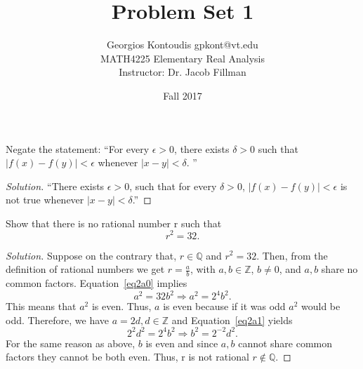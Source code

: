 \documentclass[12pt]{article}
\newenvironment{exercise}[2][Exercise]{\begin{trivlist}
\item[\hskip \labelsep {\bfseries #1}\hskip \labelsep {\bfseries #2.}]}{\end{trivlist}}
\newenvironment{solution}{\begin{proof}[Solution]}{\end{proof}}
\begin{document}
 
 
\title{Problem Set 1}
\author{Georgios Kontoudis \textbullet{} gpkont@vt.edu\\ 
MATH4225 Elementary Real Analysis\\
Instructor: Dr. Jacob Fillman} 
\date{Fall 2017}
 
\maketitle
\begin{exercise}{1} %
Negate the statement: ``For every $\epsilon >0$, there exists $\delta >0$ such that $|f(x)-f(y)|< \epsilon$ whenever $|x-y|< \delta$. ''
\end{exercise}
\begin{solution}
``There exists $\epsilon >0$, such that for every $\delta >0$, $|f(x)-f(y)|< \epsilon$ is not true whenever $|x-y|< \delta$.'' 
\end{solution}

\begin{exercise}{2 (a)} %
Show that there is no rational number r such that 
\begin{equation}\label{eq2a0}
r^2 = 32.
\end{equation}
\end{exercise}
\begin{solution}
Suppose on the contrary that, $r\in \mathbb{Q}$ and $r^2=32$. Then, from the definition of rational numbers we get $r=\frac{a}{b}$, with $a,b \in \mathbb{Z}$, $b\neq0$, and $a,b$ share no common factors. Equation~\ref{eq2a0} implies
\begin{equation}\label{eq2a1}
a^2=32b^2 \Rightarrow a^2 = 2^4 b^2.
\end{equation}
This means that $a^2$ is even. Thus, $a$ is even because if it was odd $a^2$ would be odd. Therefore, we have $a=2d, d\in \mathbb{Z}$ and Equation~\ref{eq2a1} yields
\begin{equation}
2^2d^2=2^4b^2 \Rightarrow b^2=2^{-2}d^2.
\end{equation}
For the same reason as above, $b$ is even and since $a,b$ cannot share common factors they cannot be both even. Thus, r is not rational $r \notin \mathbb{Q}$.
\end{solution}
\end{document}
